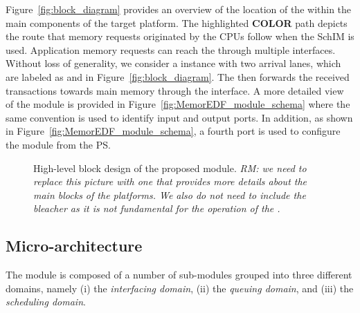 Figure~\ref{fig:block_diagram} provides an overview of the location of
the \schim within the main components of the target platform. The
highlighted {\bf COLOR} path depicts the route that memory requests
originated by the CPUs follow when the SchIM is used. Application
memory requests can reach the \schim through multiple
interfaces. Without loss of generality, we consider a \schim instance
with two arrival lanes, which are labeled as  and 
in Figure~\ref{fig:block_diagram}. The \schim then forwards the
received transactions towards main memory through the 
interface. A more detailed view of the \schim module is provided in
Figure~\ref{fig:MemorEDF_module_schema} where the same convention is
used to identify input and output ports. In addition, as shown in
Figure~\ref{fig:MemorEDF_module_schema}, a fourth  port is
used to configure the \schim module from the PS.


\begin{figure}
  \centering
  
  \caption{High-level block design of the proposed \schim
    module. \emph{RM: we need to replace this picture with one that
      provides more details about the main blocks of the platforms. We
      also do not need to include the bleacher as it is not
      fundamental for the operation of the \schim.}}
  \label{fig:SchIM_overview_schema}
\end{figure}



\subsection{Micro-architecture}
\label{subsec:micro-arch}

The \schim module is composed of a number of sub-modules grouped into
three different domains, namely (i) the \emph{interfacing domain},
(ii) the \emph{queuing domain}, and (iii) the \emph{scheduling
  domain}.

